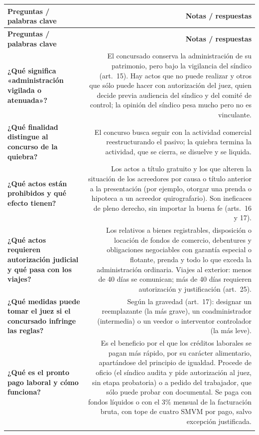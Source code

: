 \documentclass[12pt,oneside]{book}
\begin{document}
\begin{longtable}{QN}
\toprule
\textbf{Preguntas / palabras clave} & \textbf{Notas / respuestas} \\
\midrule
\endfirsthead
\toprule
\textbf{Preguntas / palabras clave} & \textbf{Notas / respuestas} \\
\midrule
\endhead

\textbf{¿Qué significa «administración vigilada o atenuada»?} &
El concursado conserva la administración de su patrimonio, pero bajo la vigilancia del síndico (art.~15). Hay actos que no puede realizar y otros que sólo puede hacer con autorización del juez, quien decide previa audiencia del síndico y del comité de control; la opinión del síndico pesa mucho pero no es vinculante. \\
\addlinespace[0.6em]

\textbf{¿Qué finalidad distingue al concurso de la quiebra?} &
El concurso busca seguir con la actividad comercial reestructurando el pasivo; la quiebra termina la actividad, que se cierra, se disuelve y se liquida. \\
\addlinespace[0.6em]

\textbf{¿Qué actos están prohibidos y qué efecto tienen?} &
Los actos a título gratuito y los que alteren la situación de los acreedores por causa o título anterior a la presentación (por ejemplo, otorgar una prenda o hipoteca a un acreedor quirografario). Son ineficaces de pleno derecho, sin importar la buena fe (arts.~16 y 17). \\
\addlinespace[0.6em]

\textbf{¿Qué actos requieren autorización judicial y qué pasa con los viajes?} &
Los relativos a bienes registrables, disposición o locación de fondos de comercio, debentures y obligaciones negociables con garantía especial o flotante, prenda y todo lo que exceda la administración ordinaria. Viajes al exterior: menos de 40 días se comunican; más de 40 días requieren autorización y justificación (art.~25). \\
\addlinespace[0.6em]

\textbf{¿Qué medidas puede tomar el juez si el concursado infringe las reglas?} &
Según la gravedad (art.~17): designar un reemplazante (la más grave), un coadministrador (intermedia) o un veedor o interventor controlador (la más leve). \\
\addlinespace[0.6em]

\textbf{¿Qué es el pronto pago laboral y cómo funciona?} &
Es el beneficio por el que los créditos laborales se pagan más rápido, por su carácter alimentario, apartándose del principio de igualdad. Procede de oficio (el síndico audita y pide autorización al juez, sin etapa probatoria) o a pedido del trabajador, que sólo puede probar con documental. Se paga con fondos líquidos o con el 3\% mensual de la facturación bruta, con tope de cuatro SMVM por pago, salvo excepción justificada. \\
\addlinespace[0.6em]


\end{longtable}
\end{document}
